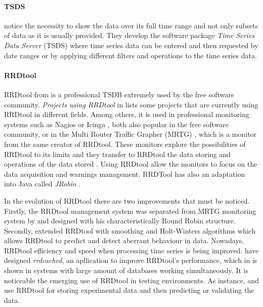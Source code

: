 \paragraph{TSDS} \textcite{weigel10} notice the necessity to show the data over its full time range and not only subsets of data as it is usually provided. 
They develop  the software package \emph{Time Series Data Server} (TSDS) \parencite{tsds} where time series data can be entered and then requested by date ranges or by applying different filters and operations to the time series data.


\paragraph{RRDtool} RRDtool from \textcite{rrdtool} is a professional TSDB extremely used by the free software community. \emph{Projects using RRDtool} in \cite{rrdtool} lists some projects that are currently using RRDtool in different fields. Among others, it is used in professional monitoring systems such as Nagios \parencite{nagios} or Icinga \parencite{icinga}, both also popular in the free software community, or  in the Multi Router Traffic Grapher (MRTG) \parencite{mrtg}, which is a monitor from the same creator of RRDtool. 
These monitors explore the possibilities of RRDtool to its limits and they transfer to RRDtool the data storing and operations of the data stored . 
Using RRDtool allow the monitors to focus on the data acquisition and warnings management. RRDTool has also an adaptation into Java called \emph{JRobin} \parencite{jrobin}.


In the evolution of RRDtool there are two improvements that must be noticed.
Firstly, the RRDtool management system was separated from MRTG monitoring system by \textcite{lisa98:oetiker} and designed with his characteristically Round Robin structure. Secondly, \textcite{lisa00:brutlag} extended RRDtool with smoothing and Holt-Winters algorithms which allows RRDtool to predict and detect aberrant behaviour in data.  
Nowadays, RRDtool efficiency and speed when processing time series is being improved. \textcite{carder:rrdcached} have designed \emph{rrdcached}, an apllication to improve RRDtool's performance, which in \cite{lisa07:plonka} is shown  in systems with large amount of databases working simultaneously.
It is noticeable the emerging use of RRDtool in testing environments. As instance, \textcite{zhang07} and \textcite{chilingaryan10} use RRDtool for storing experimental data and then predicting or validating the data.


